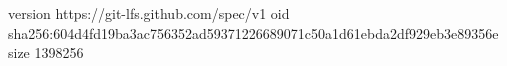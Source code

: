 version https://git-lfs.github.com/spec/v1
oid sha256:604d4fd19ba3ac756352ad59371226689071c50a1d61ebda2df929eb3e89356e
size 1398256
